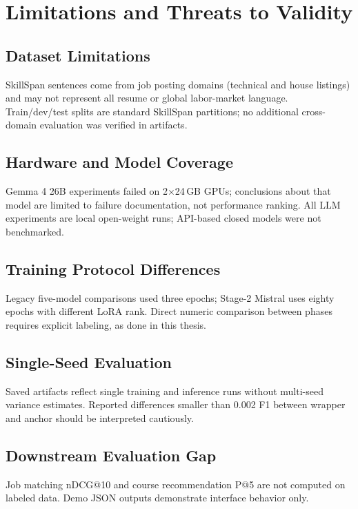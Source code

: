 \chapter{Limitations and Threats to Validity}
\label{ch:limitations}

\section{Dataset Limitations}

SkillSpan sentences come from job posting domains (technical and house listings) and may not represent all resume or global labor-market language.
Train/dev/test splits are standard SkillSpan partitions; no additional cross-domain evaluation was verified in artifacts.

\section{Hardware and Model Coverage}

Gemma 4 26B experiments failed on 2$\times$24\,GB GPUs; conclusions about that model are limited to failure documentation, not performance ranking.
All LLM experiments are local open-weight runs; API-based closed models were not benchmarked.

\section{Training Protocol Differences}

Legacy five-model comparisons used three epochs; Stage-2 Mistral uses eighty epochs with different LoRA rank.
Direct numeric comparison between phases requires explicit labeling, as done in this thesis.

\section{Single-Seed Evaluation}

Saved artifacts reflect single training and inference runs without multi-seed variance estimates.
Reported differences smaller than 0.002 F1 between wrapper and anchor should be interpreted cautiously.

\section{Downstream Evaluation Gap}

Job matching nDCG@10 and course recommendation P@5 are not computed on labeled data.
Demo JSON outputs demonstrate interface behavior only.

